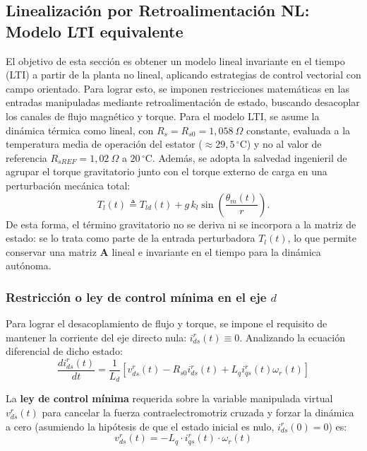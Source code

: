 \documentclass[12pt, a4paper,journal, onecolumn, compsoc]{IEEEtran}
\begin{document}
\subsection{Linealización por Retroalimentación NL: Modelo LTI equivalente}
El objetivo de esta sección es obtener un modelo lineal invariante en el tiempo (LTI) a partir de la planta no lineal, aplicando estrategias de control vectorial con campo orientado. Para lograr esto, se imponen restricciones matemáticas en las entradas manipuladas mediante retroalimentación de estado, buscando desacoplar los canales de flujo magnético y torque. Para el modelo LTI, se asume la dinámica térmica como lineal, con $R_s = R_{s0} = 1{,}058\ \Omega$ constante, evaluada a la temperatura media de operación del estator ($\approx 29{,}5\,^\circ$C) y no al valor de referencia $R_{sREF} = 1{,}02\ \Omega$ a $20\,^\circ$C. Además, se adopta la salvedad ingenieril de agrupar el torque gravitatorio junto con el torque externo de carga en una perturbación mecánica total:
\begin{equation}
    T_l(t) \triangleq T_{ld}(t) + g\,k_l\sin\left(\frac{\theta_m(t)}{r}\right).
\end{equation}
De esta forma, el término gravitatorio no se deriva ni se incorpora a la matriz de estado: se lo trata como parte de la entrada perturbadora $T_l(t)$, lo que permite conservar una matriz $\mathbf{A}$ lineal e invariante en el tiempo para la dinámica autónoma.

\subsubsection{Restricción o ley de control mínima en el eje $d$}
Para lograr el desacoplamiento de flujo y torque, se impone el requisito de mantener la corriente del eje directo nula: $i_{ds}^r(t) \equiv 0$. Analizando la ecuación diferencial de dicho estado:
\begin{equation}
    \frac{di_{ds}^r(t)}{dt} = \frac{1}{L_d} \left[ v_{ds}^r(t) - R_{s0} i_{ds}^r(t) + L_q i_{qs}^r(t) \omega_r(t) \right]
\end{equation}

La \textbf{ley de control mínima} requerida sobre la variable manipulada virtual $v_{ds}^r(t)$ para cancelar la fuerza contraelectromotriz cruzada y forzar la dinámica a cero (asumiendo la hipótesis de que el estado inicial es nulo, $i_{ds}^r(0) = 0$) es:
\begin{equation} \label{eq:vds_minima}
    v_{ds}^r(t) = -L_q \cdot i_{qs}^r(t) \cdot \omega_r(t)
\end{equation}
\end{document}
